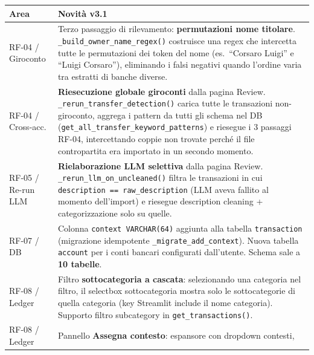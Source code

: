 \documentclass[11pt, a4paper]{article}
\begin{document}
\begin{center}
\small
\begin{longtable}{@{}L{3cm} L{10.5cm}@{}}
\toprule
\textbf{Area} & \textbf{Novità v3.1} \\
\midrule
\endhead
RF-04 / Giroconto   & Terzo passaggio di rilevamento: \textbf{permutazioni nome titolare}.
                       \texttt{\_build\_owner\_name\_regex()} costruisce una regex che
                       intercetta tutte le permutazioni dei token del nome (es.\
                       ``Corsaro Luigi'' e ``Luigi Corsaro''), eliminando i falsi negativi
                       quando l'ordine varia tra estratti di banche diverse. \\[3pt]
RF-04 / Cross-acc.  & \textbf{Riesecuzione globale giroconti} dalla pagina Review.
                       \texttt{\_rerun\_transfer\_detection()} carica tutte le transazioni
                       non-giroconto, aggrega i pattern da tutti gli schema nel DB
                       (\texttt{get\_all\_transfer\_keyword\_patterns}) e riesegue i
                       3 passaggi RF-04, intercettando coppie non trovate perché il
                       file contropartita era importato in un secondo momento. \\[3pt]
RF-05 / Re-run LLM  & \textbf{Rielaborazione LLM selettiva} dalla pagina Review.
                       \texttt{\_rerun\_llm\_on\_uncleaned()} filtra le transazioni in cui
                       \texttt{description == raw\_description} (LLM aveva fallito al
                       momento dell'import) e riesegue description cleaning +
                       categorizzazione solo su quelle. \\[3pt]
RF-07 / DB          & Colonna \texttt{context VARCHAR(64)} aggiunta alla tabella
                       \texttt{transaction} (migrazione idempotente
                       \texttt{\_migrate\_add\_context}).
                       Nuova tabella \texttt{account} per i conti bancari configurati
                       dall'utente. Schema sale a \textbf{10 tabelle}. \\[3pt]
RF-08 / Ledger      & Filtro \textbf{sottocategoria a cascata}: selezionando una categoria
                       nel filtro, il selectbox sottocategoria mostra solo le
                       sottocategorie di quella categoria (key Streamlit include il nome
                       categoria). Supporto filtro subcategory in
                       \texttt{get\_transactions()}. \\[3pt]
RF-08 / Ledger      & Pannello \textbf{Assegna contesto}: espansore con dropdown contesti,

\end{longtable}
\end{center}
\end{document}
